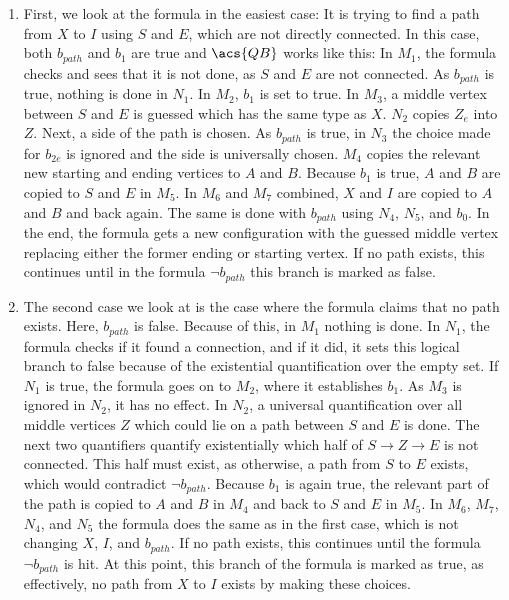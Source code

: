 \begin{enumerate}
    \item First, we look at the formula in the easiest case: It is trying to find a path from $X$ to $I$ using $S$ and $E$, which are not directly connected.
    In this case, both $b_{path}$ and $b_1$ are true and $\acs{QB}$ works like this:
    In $M_1$, the formula checks and sees that it is not done, as $S$ and $E$ are not connected.
    As $b_{path}$ is true, nothing is done in $N_1$.
    In $M_2$, $b_1$ is set to true.
    In $M_3$, a middle vertex between $S$ and $E$ is guessed which has the same type as $X$.
    $N_2$ copies $Z_e$ into $Z$.
    Next, a side of the path is chosen.
    As $b_{path}$ is true, in $N_3$ the choice made for $b_{2e}$ is ignored and the side is universally chosen.
    $M_4$ copies the relevant new starting and ending vertices to $A$ and $B$.
    Because $b_1$ is true, $A$ and $B$ are copied to $S$ and $E$ in $M_5$.
    In $M_6$ and $M_7$ combined, $X$ and $I$ are copied to $A$ and $B$ and back again.
    The same is done with $b_{path}$ using $N_4$, $N_5$, and $b_0$.
    In the end, the formula gets a new configuration with the guessed middle vertex replacing either the former ending or starting vertex.
    If no path exists, this continues until in the formula $\neg b_{path}$ this branch is marked as false.

    \item The second case we look at is the case where the formula claims that no path exists.
    Here, $b_{path}$ is false.
    Because of this, in $M_1$ nothing is done.
    In $N_1$, the formula checks if it found a connection, and if it did, it sets this logical branch to false because of the existential quantification over the empty set.
    If $N_1$ is true, the formula goes on to $M_2$, where it establishes $b_1$.
    As $M_3$ is ignored in $N_2$, it has no effect.
    In $N_2$, a universal quantification over all middle vertices $Z$ which could lie on a path between $S$ and $E$ is done.
    The next two quantifiers quantify existentially which half of $S \to Z \to E$ is not connected.
    This half must exist, as otherwise, a path from $S$ to $E$ exists, which would contradict $\neg b_{path}$.
    Because $b_1$ is again true, the relevant part of the path is copied to $A$ and $B$ in $M_4$ and back to $S$ and $E$ in $M_5$.
    In $M_6$, $M_7$, $N_4$, and $N_5$ the formula does the same as in the first case, which is not changing $X$, $I$,    and $b_{path}$.
    If no path exists, this continues until the formula $\neg b_{path}$ is hit.
    At this point, this branch of the formula is marked as true, as effectively, no path from $X$ to $I$ exists by making these choices.


\end{enumerate}
